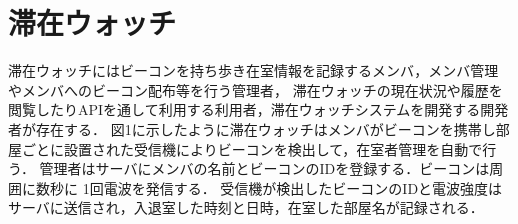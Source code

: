 
\section{滞在ウォッチ}
\label{sec:const}
滞在ウォッチにはビーコンを持ち歩き在室情報を記録するメンバ，メンバ管理やメンバへのビーコン配布等を行う管理者，
滞在ウォッチの現在状況や履歴を閲覧したりAPIを通して利用する利用者，滞在ウォッチシステムを開発する開発者が存在する．
図1に示したように滞在ウォッチはメンバがビーコンを携帯し部屋ごとに設置された受信機によりビーコンを検出して，在室者管理を自動で行う．
管理者はサーバにメンバの名前とビーコンのIDを登録する．ビーコンは周囲に数秒に 1回電波を発信する．
受信機が検出したビーコンのIDと電波強度はサーバに送信され，入退室した時刻と日時，在室した部屋名が記録される．



